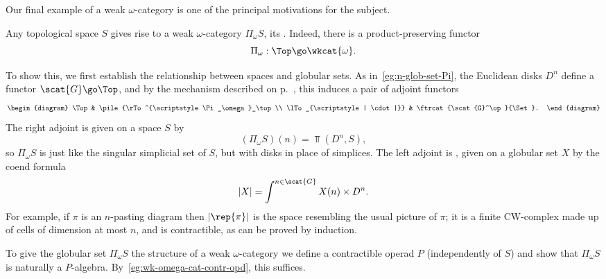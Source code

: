Our final example of a weak $\omega$-category is one of the principal
motivations for the subject. 
% 
\begin{example}	
Any topological space $S$ gives rise to a weak $\omega$-category
$\Pi_\omega S$,%
% 
% 
its .%
%
%
  Indeed, there
is a product-preserving functor
\[
\Pi_\omega: \Top \go \wkcat{\omega}.
\]

To show this, we first establish the relationship between spaces and
globular sets.  As in~\ref{eg:n-glob-set-Pi}, the Euclidean disks $D^n$
define a functor $\scat{G} \go \Top$, and by the mechanism described on
p.~\pageref{eq:induced-adjn}, this induces a pair of adjoint functors
\[
\begin{diagram}
\Top	&
\pile{\rTo^{\scriptstyle \Pi_\omega}_\top\\ 
	\lTo_{\scriptstyle | \cdot |}}	&
\ftrcat{\scat{G}^\op}{\Set}.
\end{diagram}
\]
The right adjoint is given on a space $S$ by
\[
(\Pi_\omega S)(n) = \Top(D^n, S),
\]
so $\Pi_\omega S$ is just like the singular simplicial set of $S$, but with
disks in place of simplices.  The left adjoint is , given on a globular set $X$ by the coend%
%
% 
formula
\[
|X| = \int^{n\in \scat{G}} X(n) \times D^n.
\]
For example, if $\pi$ is an $n$-pasting diagram then $|\rep{\pi}|$ is the
space resembling the usual picture of $\pi$; it is a finite CW-complex made
up of cells of dimension at most $n$, and is contractible, as can be proved
by induction.

To give the globular set $\Pi_\omega S$ the structure of a weak
$\omega$-category we define a contractible operad $P$ (independently of
$S$) and show that $\Pi_\omega S$ is naturally a $P$-algebra.
By~\ref{eg:wk-omega-cat-contr-opd}, this suffices.


\end{example}
